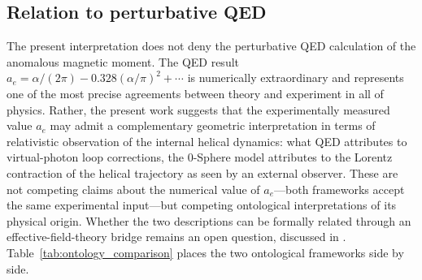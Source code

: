 \documentclass[%
 reprint, amsmath,amssymb, aps, prb, ]{revtex4-2}
\numberwithin{equation}{section}
\begin{document}
\subsection{Relation to perturbative QED}
\label{subsec:QED_complement}

The present interpretation does not deny the perturbative QED calculation of the anomalous magnetic moment. The QED result $a_e = \alpha/(2\pi) - 0.328(\alpha/\pi)^2 + \cdots$ is numerically extraordinary and represents one of the most precise agreements between theory and experiment in all of physics. Rather, the present work suggests that the experimentally measured value $a_e$ may admit a complementary geometric interpretation in terms of relativistic observation of the internal helical dynamics: what QED attributes to virtual-photon loop corrections, the 0-Sphere model attributes to the Lorentz contraction of the helical trajectory as seen by an external observer. These are not competing claims about the numerical value of $a_e$---both frameworks accept the same experimental input---but competing ontological interpretations of its physical origin. Whether the two descriptions can be formally related through an effective-field-theory bridge remains an open question, discussed in \cite{hanamura36}. Table~\ref{tab:ontology_comparison} places the two ontological frameworks side by side.
\end{document}
